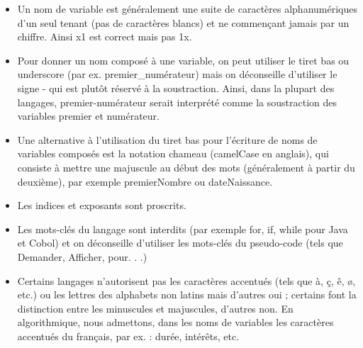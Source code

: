 \documentclass[11pt,a4paper]{article}
\begin{document}
					\begin{itemize}
				
			\item 
            Un nom de variable est g\'en\'eralement une suite de caract\`eres alphanum\'eriques d'un
            seul tenant (pas de caract\`eres blancs) et ne commen\c cant jamais par un chiffre. Ainsi
            x1 est correct mais pas 1x.
            
			\item 
            Pour donner un nom compos\'e \`a une variable, on peut utiliser le \guillemotleft  tiret bas \guillemotright  ou underscore 
            (par ex. premier\_num\'erateur) mais on d\'econseille d'utiliser le signe \guillemotleft  - \guillemotright  qui est
            plut\^ot r\'eserv\'e \`a la soustraction. Ainsi, dans la plupart des langages, premier-num\'erateur
            serait interpr\'et\'e comme la soustraction des variables premier et num\'erateur.
            
			\item 
            Une alternative \`a l'utilisation du tiret bas pour l'\'ecriture de noms de variables compos\'es
            est la notation \guillemotleft  chameau \guillemotright  (camelCase en anglais), qui consiste \`a mettre une majuscule
            au d\'ebut des mots (g\'en\'eralement \`a partir du deuxi\`eme), par exemple premierNombre
            ou dateNaissance.
            
			\item 
            Les indices et exposants sont proscrits.
            
			\item 
            Les mots-cl\'es du langage sont interdits (par exemple for, if, while pour Java et Cobol)
            et on d\'econseille d'utiliser les mots-cl\'es du pseudo-code (tels que Demander, Afficher, pour. . .)
            
			\item 
            Certains langages n'autorisent pas les caract\`eres accentu\'es (tels que \`a, \c c, \^e, \o, etc.)
            ou les lettres des alphabets non latins mais d'autres oui ; certains font la
            distinction entre les minuscules et majuscules, d'autres non. En algorithmique, nous
            admettons, dans les noms de variables les caract\`eres accentu\'es du fran\c cais, par ex. :
            dur\'ee, int\'er\^ets, etc.
            
					\end{itemize}
				
\end{document}
